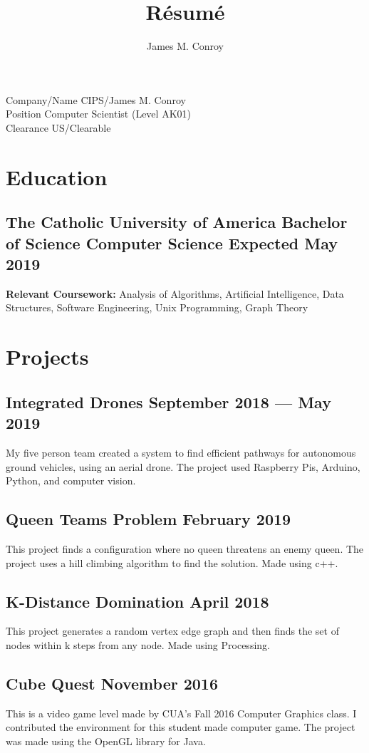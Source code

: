 \documentclass{article}
\author{James M. Conroy}
\title{R\'esum\'e}
\renewcommand{\maketitle}{
\begin{tabbing}
Company/Name \= CIPS/James M. Conroy \\
Position \> Computer Scientist (Level AK01) \\
Clearance \> US/Clearable \\
\end{tabbing}
}
\begin{document}
\maketitle
\section{Education}
\subsection{The Catholic University of America \hfill Bachelor of Science Computer Science \hfill  Expected May 2019 }

\textbf {Relevant Coursework:}
Analysis of Algorithms,
Artificial Intelligence,
Data Structures,
Software Engineering,
Unix Programming,
Graph Theory

\section{Projects}
\subsection{Integrated Drones \hfill September 2018 --- May 2019}
My five person team created a system to find efficient pathways for autonomous ground vehicles, using an aerial drone.
The project used Raspberry Pis, Arduino, Python, and computer vision.

\subsection{Queen Teams Problem \hfill February 2019}
This project finds a configuration where no queen threatens an enemy queen.
The project uses a hill climbing algorithm to find the solution.
Made using c++.

\subsection{K-Distance Domination \hfill April 2018}
This project generates a random vertex edge graph and then finds the set of nodes within k steps from any node.
Made using Processing.

\subsection{Cube Quest \hfill November 2016}
This is a video game level made by CUA's Fall 2016 Computer Graphics class.
I contributed the environment for this student made computer game.
The project was made using the OpenGL library for Java.
\end{document}
